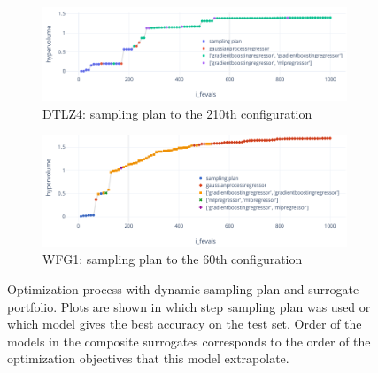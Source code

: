     \begin{figure}
        \centering
        \begin{subfigure}{\textwidth}
            \includegraphics[width=\textwidth]{content/images/dtlz4_models}
            \caption{DTLZ4: sampling plan to the 210th configuration}
            \label{fig:dtlz4_models_210}
        \end{subfigure}
        
        \begin{subfigure}{\textwidth}
            \includegraphics[width=\textwidth]{content/images/wfg1_models}
            \caption{WFG1: sampling plan to the 60th configuration}
            \label{fig:wfg1_models_60}
        \end{subfigure} 

        \caption[Optimization process with dynamic sampling plan and surrogate portfolio.]{Optimization process with dynamic sampling plan and surrogate portfolio. Plots are shown in which step sampling plan was used or which model gives the best accuracy on the test set. Order of the models in the composite surrogates corresponds to the order of the optimization objectives that this model extrapolate.}
        \label{fig:changing_models}    
    \end{figure}


